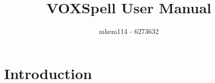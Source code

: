 \documentclass[12pt,a4paper,titlepage,onecolumn]{article}
\author{mkem114 - 6273632}
\title{VOXSpell User Manual}
\begin{document}
	\maketitle
	\section{Introduction}
\end{document}
